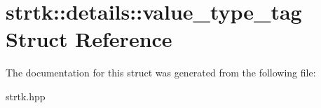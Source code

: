 \hypertarget{structstrtk_1_1details_1_1value__type__tag}{\section{strtk\-:\-:details\-:\-:value\-\_\-type\-\_\-tag Struct Reference}
\label{structstrtk_1_1details_1_1value__type__tag}
}


The documentation for this struct was generated from the following file\-:\begin{DoxyCompactItemize}
\item 
strtk.\-hpp\end{DoxyCompactItemize}
